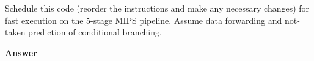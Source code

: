 \documentclass[paper=usletter, fontsize=12pt]{article}
\begin{document}
\begin{enumerate}
        Schedule this code (reorder the instructions and make any necessary changes) for fast execution on the 5-stage MIPS pipeline. Assume data forwarding and not-taken prediction of conditional branching.

        \textbf{Answer} \\


    \end{enumerate}
\end{document}
